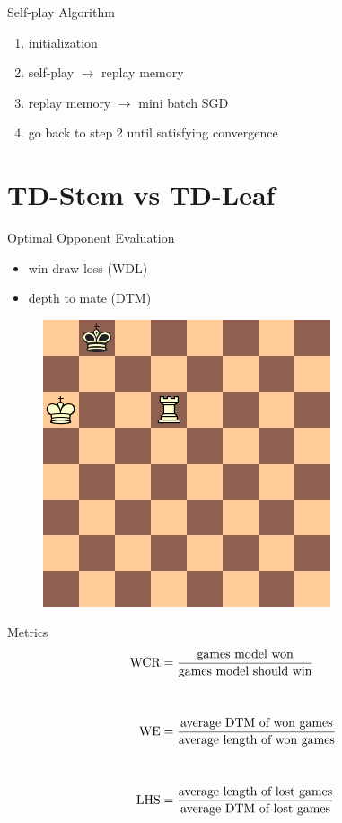 \documentclass{beamer}
\begin{document}
\begin{frame}{Self-play Algorithm}
\begin{enumerate}
	\item initialization
	\item self-play $\rightarrow$ replay memory
	\item replay memory $\rightarrow$ mini batch SGD
	\item go back to step 2 until satisfying convergence
\end{enumerate}
\end{frame}

\section{TD-Stem vs TD-Leaf}

\begin{frame}{Optimal Opponent Evaluation}
	\begin{itemize}
		\item win draw loss (WDL)
		\item depth to mate (DTM)
	\end{itemize}
	\begin{figure}
		\includegraphics[scale=0.4]{fig/search/3}
	\end{figure}
\end{frame}

\begin{frame}{Metrics}
	\begin{align*}
	\textnormal{WCR}&=\frac{\text{games model won}}{\text{games model should win}} \\[1cm]
	\textnormal{WE}&=\frac{\text{average DTM of won games}}{\text{average length of won games}}\\[1cm]
	\textnormal{LHS}&=\frac{\text{average length of lost games}}{\text{average DTM of lost games}}\\
	\end{align*}
\end{frame}
\end{document}
